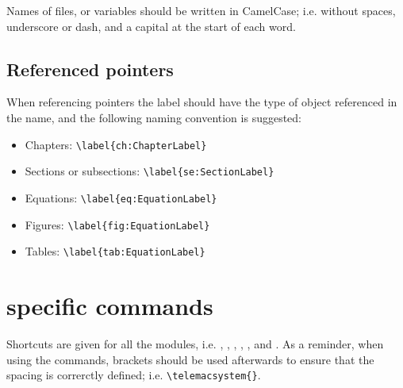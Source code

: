 Names of files, or variables should be written in CamelCase; i.e. without
spaces, underscore or dash, and a capital at the start of each word.

\subsection{Referenced pointers}

When referencing pointers the label should have the type of object referenced
in the name, and the following naming convention is suggested:

\begin{itemize}
\item Chapters: \verb+\label{ch:ChapterLabel}+
\item Sections or subsections: \verb+\label{se:SectionLabel}+
\item Equations: \verb+\label{eq:EquationLabel}+
\item Figures: \verb+\label{fig:EquationLabel}+
\item Tables: \verb+\label{tab:EquationLabel}+
\end{itemize}


\section{\texorpdfstring{\telemacsystem{}}{Telemac} specific commands}

Shortcuts are given for all the modules, i.e. \telemacsystem{}, \artemis{},
\bief{}, \sisyphe{}, ,  and \tomawac{}. As a reminder,
when using the commands, brackets should be used afterwards to ensure that the
spacing is correrctly defined; i.e. \verb+\telemacsystem{}+.

